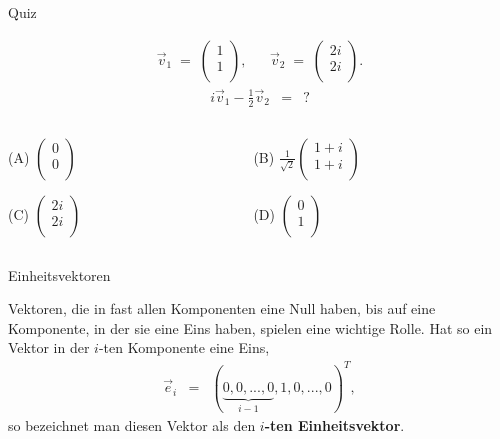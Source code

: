 \documentclass[german]{beamer}
\newcommand{\bq}{\begin{eqnarray*}}
\newcommand{\eq}{\end{eqnarray*}}
\begin{document}
\begin{frame}{Quiz}

\bq
 \vec{v}_1 \; = \; \left( \begin{array}{c} 1 \\ 1 \\ \end{array} \right),
 & &
 \vec{v}_2 \; = \; \left( \begin{array}{c} 2 i \\ 2 i \\ \end{array} \right).
\eq
\bq
 i \vec{v}_1 - \frac{1}{2} \vec{v}_2 & = & ?
\eq 
\begin{columns}[b]
\begin{column}{5cm}
\begin{description}
\item{(A)} $\left( \begin{array}{c} 0 \\ 0 \\ \end{array} \right)$
\item{(C)} $\left( \begin{array}{c} 2 i \\ 2 i \\ \end{array} \right)$
\end{description}
\end{column}
\begin{column}{6cm}
\begin{description}
\item{(B)} $\frac{1}{\sqrt{2}} \left( \begin{array}{c} 1+i \\ 1+i \\ \end{array} \right)$
\item{(D)} $\left( \begin{array}{c} 0 \\ 1 \\ \end{array} \right)$
\end{description}
\end{column}
\end{columns}

\end{frame}

\begin{frame}{Einheitsvektoren}

\begin{definition}
Vektoren, die in fast allen Komponenten eine Null haben, bis auf eine Komponente, in
der sie eine Eins haben, spielen eine wichtige Rolle. Hat so ein Vektor 
in der $i$-ten Komponente eine Eins,
\bq
 \vec{e}_i & = & \left( \underbrace{0,0,...,0}_{i-1},1,0,...,0 \right)^T,
\eq
so bezeichnet man diesen Vektor als den {\bf $i$-ten Einheitsvektor}.
\end{definition}

\end{frame}
\end{document}
